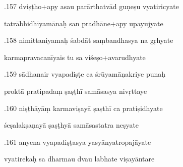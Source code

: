 \documentclass[article,12pt,a4paper]{memoir}%
\newcounter{parCount}
\begin{document}
	  
	  \pstart {}.157 dviṣṭho+apy asau parārthatvād guṇeṣu vyatiricyate 
	{}
	\pend%
      

	  
	  \pstart \leavevmode%
	tatrābhidhīyamānaḥ san pradhāne+apy upayujyate 
	{}
	\pend%
      

	  
	  \pstart {}.158 nimittaniyamaḥ śabdāt saṃbandhasya na gṛhyate 
	{}
	\pend%
      

	  
	  \pstart \leavevmode%
	karmapravacanīyais tu sa viśeṣo+avarudhyate 
	{}
	\pend%
      

	  
	  \pstart {}.159 sādhanair vyapadiṣṭe ca śrūyamāṇakriye punaḥ 
	{}
	\pend%
      

	  
	  \pstart \leavevmode%
	proktā pratipadaṃ ṣaṣṭhī samāsasya nivṛttaye 
	{}
	\pend%
      

	  
	  \pstart {}.160 niṣṭhāyāṃ karmaviṣayā ṣaṣthī ca pratiṣidhyate 
	{}
	\pend%
      

	  
	  \pstart \leavevmode%
	śeṣalakṣaṇayā ṣaṣṭhyā samāsastatra neṣyate 
	{}
	\pend%
      

	  
	  \pstart {}.161 anyena vyapadiṣṭasya yasyānyatropajāyate 
	{}
	\pend%
      

	  
	  \pstart \leavevmode%
	vyatirekaḥ sa dharmau dvau labhate viṣayāntare 
	{}
	\pend%
      
\end{document}
